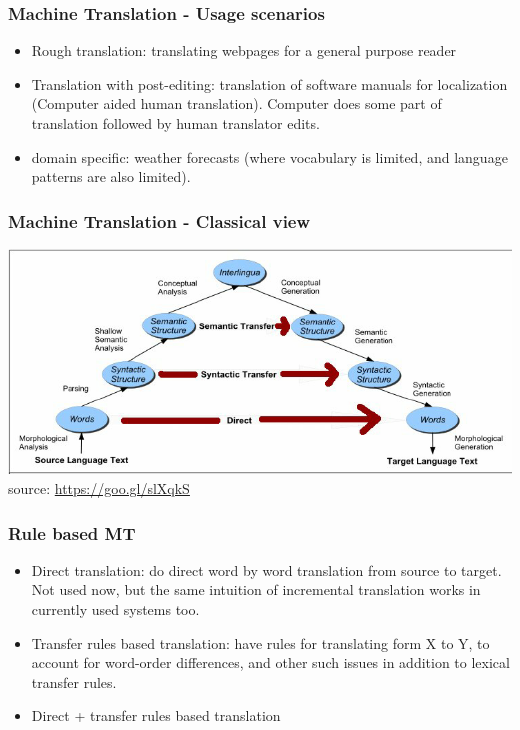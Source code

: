 \documentclass{beamer}
\begin{document}
\begin{frame}
\frametitle{Machine Translation - Usage scenarios}
\begin{itemize}
\item Rough translation: translating webpages for a general purpose reader
\item Translation with post-editing: translation of software manuals for localization (Computer aided human translation). Computer does some part of translation followed by human translator edits.
\item domain specific: weather forecasts (where vocabulary is limited, and language patterns are also limited).
\end{itemize}
\end{frame}

\begin{frame}
\frametitle{Machine Translation - Classical view}
\includegraphics[width=\textwidth]{interlingua.png}
\\ source: \url{https://goo.gl/slXqkS}
\end{frame} %

\begin{frame}
\frametitle{Rule based MT}
\begin{itemize}
\item Direct translation: do direct word by word translation from source to target. Not used now, but the same intuition of incremental translation works in currently used systems too.
\item Transfer rules based translation: have rules for translating form X to Y, to account for word-order differences, and other such issues in addition to lexical transfer rules.
\item Direct + transfer rules based translation
\end{itemize}
\end{frame} %
\end{document}
